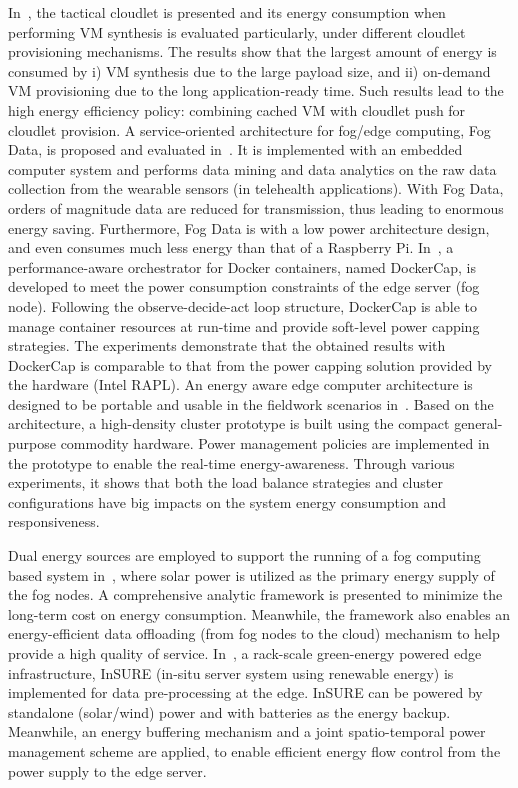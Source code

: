 In~, the tactical cloudlet is presented and its energy consumption when performing VM synthesis is evaluated particularly, under different cloudlet provisioning mechanisms. The results show that the largest amount of energy is consumed by i) VM synthesis due to the large payload size, and ii) on-demand VM provisioning due to the long application-ready time. Such results lead to the high energy efficiency policy: combining cached VM with cloudlet push for cloudlet provision.
A service-oriented architecture for fog/edge computing, Fog Data, is proposed and evaluated in~. It is implemented with an embedded computer system and performs data mining and data analytics on the raw data collection from the wearable sensors (in telehealth applications). With Fog Data, orders of magnitude data are reduced for transmission, thus leading to enormous energy saving. Furthermore, Fog Data is with a low power architecture design, and even consumes much less energy than that of a Raspberry Pi.
In~, a performance-aware orchestrator for Docker containers, named DockerCap, is developed to meet the power consumption constraints of the edge server (fog node). Following the observe-decide-act loop structure, DockerCap is able to manage container resources at run-time and provide soft-level power capping strategies. The experiments demonstrate that the obtained results with DockerCap is comparable to that from the power capping solution provided by the hardware (Intel RAPL).
An energy aware edge computer architecture is designed to be portable and usable in the fieldwork scenarios in~. Based on the architecture, a high-density cluster prototype is built using the compact general-purpose commodity hardware. Power management policies are implemented in the prototype to enable the real-time energy-awareness. Through various experiments, it shows that both the load balance strategies and cluster configurations have big impacts on the system energy consumption and responsiveness.

Dual energy sources are employed to support the running of a fog computing based system in~, where solar power is utilized as the primary energy supply of the fog nodes. A comprehensive analytic framework is presented to minimize the long-term cost on energy consumption. Meanwhile, the framework also enables an energy-efficient data offloading (from fog nodes to the cloud) mechanism to help provide a high quality of service.
In~, a rack-scale green-energy powered edge infrastructure, InSURE (in-situ server system using renewable energy) is implemented for data pre-processing at the edge. InSURE can be powered by standalone (solar/wind) power and with batteries as the energy backup. Meanwhile, an energy buffering mechanism and a joint spatio-temporal power management scheme are applied, to enable efficient energy flow control from the power supply to the edge server.

